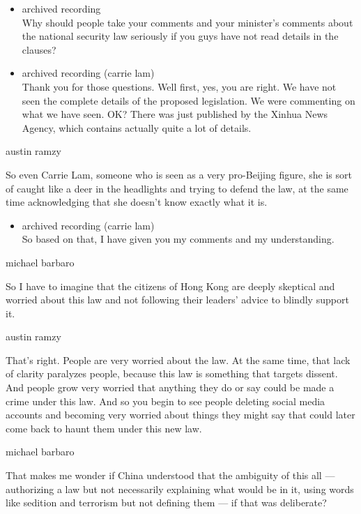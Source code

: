 \begin{itemize}
\item
  archived recording\\
  Why should people take your comments and your minister's comments
  about the national security law seriously if you guys have not read
  details in the clauses?
\item
  archived recording (carrie lam)\\
  Thank you for those questions. Well first, yes, you are right. We have
  not seen the complete details of the proposed legislation. We were
  commenting on what we have seen. OK? There was just published by the
  Xinhua News Agency, which contains actually quite a lot of details.
\end{itemize}

austin ramzy

So even Carrie Lam, someone who is seen as a very pro-Beijing figure,
she is sort of caught like a deer in the headlights and trying to defend
the law, at the same time acknowledging that she doesn't know exactly
what it is.

\begin{itemize}
\tightlist
\item
  archived recording (carrie lam)\\
  So based on that, I have given you my comments and my understanding.
\end{itemize}

michael barbaro

So I have to imagine that the citizens of Hong Kong are deeply skeptical
and worried about this law and not following their leaders' advice to
blindly support it.

austin ramzy

That's right. People are very worried about the law. At the same time,
that lack of clarity paralyzes people, because this law is something
that targets dissent. And people grow very worried that anything they do
or say could be made a crime under this law. And so you begin to see
people deleting social media accounts and becoming very worried about
things they might say that could later come back to haunt them under
this new law.

michael barbaro

That makes me wonder if China understood that the ambiguity of this all
--- authorizing a law but not necessarily explaining what would be in
it, using words like sedition and terrorism but not defining them --- if
that was deliberate?

